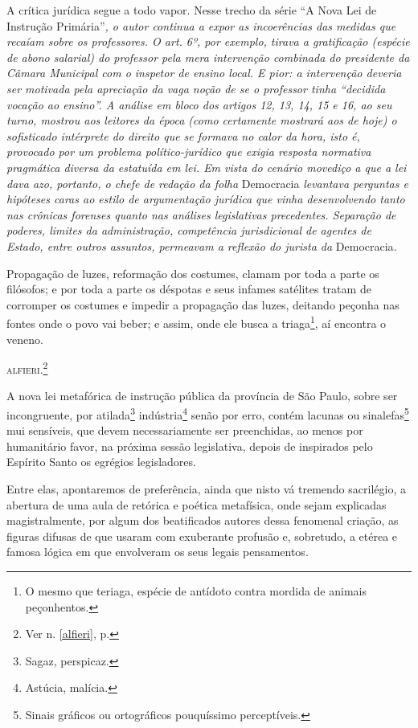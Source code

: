 \begin{didascalia}
A crítica jurídica segue a todo vapor. Nesse trecho da série ``A Nova
Lei de Instrução Primária''\emph{, o autor continua a expor as
incoerências das medidas que recaíam sobre os professores. O art. 6º,
por exemplo, tirava a gratificação (espécie de abono salarial) do
professor pela mera intervenção combinada do presidente da Câmara
Municipal com o inspetor de ensino local. E pior: a intervenção deveria
ser motivada pela apreciação da vaga noção de se o professor tinha
``decidida vocação ao ensino''. A análise em bloco dos artigos 12, 13, 14,
15 e 16, ao seu turno, mostrou aos leitores da época (como certamente
mostrará aos de hoje) o sofisticado intérprete do direito que se formava
no calor da hora, isto é, provocado por um problema político-jurídico
que exigia resposta normativa pragmática diversa da estatuída em lei. Em
vista do cenário movediço a que a lei dava azo, portanto, o chefe de
redação da folha} Democracia \emph{levantava perguntas e hipóteses caras
ao estilo de argumentação jurídica que vinha desenvolvendo tanto nas
crônicas forenses quanto nas análises legislativas precedentes.
Separação de poderes, limites da administração, competência
jurisdicional de agentes de Estado, entre outros assuntos, permeavam a
reflexão do jurista da} Democracia\emph{.}
\end{didascalia}



Propagação de luzes, reformação dos costumes, clamam por toda a parte os
filósofos; e por toda a parte os déspotas e seus infames satélites
tratam de corromper os costumes e impedir a propagação das luzes,
deitando peçonha nas fontes onde o povo vai beber; e assim, onde ele
busca a triaga\footnote{O mesmo que teriaga, espécie de antídoto
  contra mordida de animais peçonhentos.}, aí encontra o veneno.

\textsc{alfieri}.\footnote{Ver n. \ref{alfieri}, p. \pageref{alfieri}}

A nova lei metafórica de instrução pública da província de São Paulo,
sobre ser incongruente, por atilada\footnote{Sagaz, perspicaz.}
indústria\footnote{Astúcia, malícia.} senão por erro, contém lacunas
ou sinalefas\footnote{Sinais gráficos ou ortográficos pouquíssimo
  perceptíveis.} mui sensíveis, que devem necessariamente ser
preenchidas, ao menos por humanitário favor, na próxima sessão
legislativa, depois de inspirados pelo Espírito Santo os egrégios
legisladores.

Entre elas, apontaremos de preferência, ainda que nisto vá tremendo
sacrilégio, a abertura de uma aula de retórica e poética metafísica,
onde sejam explicadas magistralmente, por algum dos beatificados autores
dessa fenomenal criação, as figuras difusas de que usaram com exuberante
profusão e, sobretudo, a etérea e famosa lógica em que envolveram os
seus legais pensamentos.


